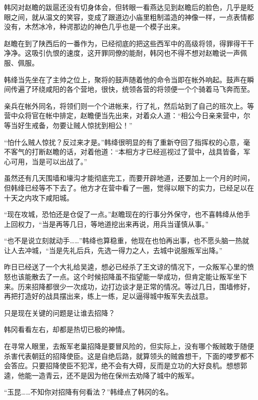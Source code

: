 韩冈对赵瞻的跋扈还没有切身体会，但转眼一看燕达见到赵瞻后的脸色，几乎是眨眼之间，就从温文的笑容，变成了跟道边小庙里粗制滥造的神像一样，一点表情都没有，木然冰冷，种谔那边的神色几乎也是一个模子出来。

赵瞻在到了陕西后的一番作为，已经彻底的把这些西军中的高级将领，得罪得干干净净。这吸引仇恨的速度，这开罪同僚的能耐，韩冈也不得不想对赵瞻说一声佩服、佩服。

韩绛当先坐在了主帅之位上，聚将的鼓声随着他的命令当即在帐外响起。鼓声在瞬间传遍了环绕咸阳的各个营地，很快，统领各营的将领便一个个骑着马飞奔而至。

亲兵在帐外同名，将领们则一个个进帐来，行了礼，然后站到了自己的班次上。等营中众将官在帐中排定，赵瞻便当先出来，对着众人道：“相公今日亲来营中，尔等当好生戒备，勿要让贼人惊扰到相公！”

“怕什么贼人惊扰？反过来才是。”韩绛很明显的有了重新夺回了指挥权的心意，毫不客气的打断赵瞻的话，对着他道：“本相方才已经巡视过了营中，战具皆备，军心可用，当是可以出战了。”

虽然还有几天围墙和壕沟才能彻底完工，而要开辟地道，还要加上一个月的时间，但韩绛已经等不下去了。他方才在营中看了一圈，觉得以眼下的实力，已经足以在十天之内攻下咸阳城。

“现在攻城，恐怕还是仓促了一点。”赵瞻现在的行事分外保守，也不喜韩绛从他手上回权力，“当是再等几日，等地道挖出来再说，用兵当谨慎从事。”

“也不是说立刻就动手……”韩绛也算稳重，他现在也怕再出事，也不愿头脑一热就让人去冲城，“当是先礼后兵，先选一得力之人，去城中说服叛军出降。”

昨日已经送了一个大礼给吴逵，想必已经杀了王文谅的情况下，一众叛军心里的愤怒也该能散去了一点。这个时候招降虽不指望能一举成功，但肯定能让叛军坐下来。历来招降都很少一次成功，边打边谈才是正常的情况。等过几日，围墙修好，再把打造好的战具摆出来，练上一练，足以逼得城中叛军失去战意。

只是现在关键的问题是让谁去招降？

韩冈看看左右，却都是热切已极的神情。

在寻常人眼里，去叛军老巢招降是要冒风险的，但实际上，没有哪个叛贼敢于随便杀害代表朝廷的招降使臣。这是自绝后路，就算领头的贼酋想干，下面的喽罗都不会答应。只要招降使臣不犯浑，绝不会有大碍，反而是立功的大好良机。想想郭逵，他能一造青云，还不是因为他在保州去劝降了城中的叛军。

“玉昆……不知你对招降有何看法？”韩绛点了韩冈的名。

